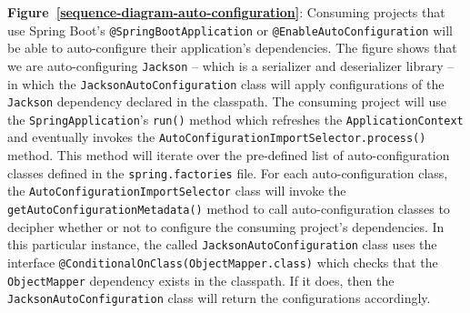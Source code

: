 \textbf{Figure~\ref{sequence-diagram-auto-configuration}}: Consuming projects that use Spring Boot's \texttt{@SpringBootApplication} or \texttt{@EnableAutoConfiguration} will be able to auto-configure their application's dependencies. The figure shows that we are auto-configuring \texttt{Jackson} -- which is a serializer and deserializer library -- in which the \texttt{JacksonAutoConfiguration} class will apply configurations of the \texttt{Jackson} dependency declared in the classpath. The consuming project will use the \texttt{SpringApplication}'s \texttt{run()} method which refreshes the \texttt{ApplicationContext} and eventually invokes the \texttt{AutoConfigurationImportSelector.process()} method. This method will iterate over the pre-defined list of auto-configuration classes defined in the \texttt{spring.factories} file. For each auto-configuration class, the \texttt{AutoConfigurationImportSelector} class will invoke the \texttt{getAutoConfigurationMetadata()} method to call auto-configuration classes to decipher whether or not to configure the consuming project's dependencies. In this particular instance, the called \texttt{JacksonAutoConfiguration} class uses the interface \texttt{@ConditionalOnClass(ObjectMapper.class)} which checks that the \texttt{ObjectMapper} dependency exists in the classpath. If it does, then the \texttt{JacksonAutoConfiguration} class will return the configurations accordingly.

